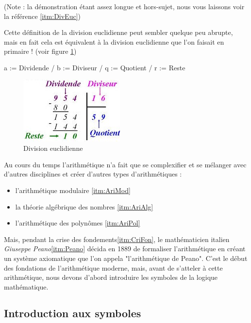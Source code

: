 (Note : la démonstration étant assez longue et hors-sujet, nous vous laissons voir la référence \ref{itm:DivEuc}) \newline

Cette définition de la division euclidienne peut sembler quelque peu abrupte, mais en fait cela est équivalent à la division euclidienne que l'on faisait en primaire ! (voir figure \ref{fig:DivEuc}) \newline

a := Dividende / b := Diviseur / q := Quotient / r := Reste
\begin{figure}[h]
    \centering
    \includegraphics{division_euclidienne.jpg}
    \caption{Division euclidienne}
    \label{fig:DivEuc}
\end{figure}
\newline \newline \newline
Au cours du temps l'arithmétique n'a fait que se complexifier et se mélanger avec d'autres disciplines et créer d'autres types d'arithmétiques :

\begin{itemize}
    \item l'arithmétique modulaire \ref{itm:AriMod}
    \item la théorie algébrique des nombres \ref{itm:AriAlg}
    \item l'arithmétique des polynômes \ref{itm:AriPol}
\end{itemize}

Mais, pendant la crise des fondements\ref{itm:CriFon}, le mathématicien italien \textit{Giuseppe Peano}\ref{itm:Peano} décida en 1889 de formaliser l'arithmétique en créant un système axiomatique que l'on appela "l'arithmétique de Peano". \newline
C'est le début des fondations de l'arithmétique moderne, mais, avant de s'atteler à cette arithmétique, nous devons d'abord introduire les symboles de la logique mathématique.

\subsection{Introduction aux symboles}

